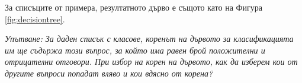 \begin{enumerate}[resume]
За списъците от примера, резултатното дърво е същото като на Фигура \ref{fig:decisiontree}. 

\emph{Упътване: За даден списък с класове, коренът на дървото за класификацията им ще съдържа този въпрос, за който има равен брой положителни и отрицателни отговори. При избор на корен на дървото, как да изберем кои от другите въпроси попадат вляво и кои вдясно от корена?}
\end{enumerate}


